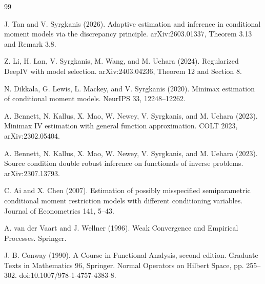 \documentclass{article}
\begin{document}
\begin{thebibliography}{99}

   J. Tan and V. Syrgkanis (2026). Adaptive estimation and inference in conditional moment models via the discrepancy principle. arXiv:2603.01337, Theorem 3.13 and Remark 3.8.

   Z. Li, H. Lan, V. Syrgkanis, M. Wang, and M. Uehara (2024). Regularized DeepIV with model selection. arXiv:2403.04236, Theorem 12 and Section 8.

   N. Dikkala, G. Lewis, L. Mackey, and V. Syrgkanis (2020). Minimax estimation of conditional moment models. NeurIPS 33, 12248--12262.

   A. Bennett, N. Kallus, X. Mao, W. Newey, V. Syrgkanis, and M. Uehara (2023). Minimax IV estimation with general function approximation. COLT 2023, arXiv:2302.05404.

   A. Bennett, N. Kallus, X. Mao, W. Newey, V. Syrgkanis, and M. Uehara (2023). Source condition double robust inference on functionals of inverse problems. arXiv:2307.13793.

   C. Ai and X. Chen (2007). Estimation of possibly misspecified semiparametric conditional moment restriction models with different conditioning variables. Journal of Econometrics 141, 5--43.

   A. van der Vaart and J. Wellner (1996). Weak Convergence and Empirical Processes. Springer.

   J. B. Conway (1990). A Course in Functional Analysis, second edition. Graduate Texts in Mathematics 96, Springer. Normal Operators on Hilbert Space, pp. 255--302. doi:10.1007/978-1-4757-4383-8.

\end{thebibliography}
\end{document}
